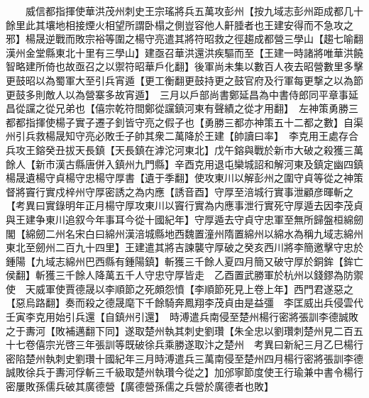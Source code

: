 　　威信都指揮使華洪茂州刺史王宗瑤將兵五萬攻彭州【按九域志彭州距成都几十餘里此其壤地相接煙火相望所謂卧榻之側豈容他人鼾腄者也王建安得而不急攻之邪】楊晟逆戰而敗宗裕等圍之楊守亮遣其將符昭救之徑趨成都營三學山【趨七喻翻漢州金堂縣東北十里有三學山】建亟召華洪還洪疾驅而至【王建一時諸將唯華洪饒智略建所倚也故亟召之以禦符昭華戶化翻】後軍尚未集以數百人夜去昭營數里多擊更鼓昭以為蜀軍大至引兵宵遁【更工衡翻更鼓持更之鼓官府及行軍每更撃之以為節更鼓多則敵人以為營寨多故宵遁】　三月以戶部尚書鄭延昌為中書侍郎同平章事延昌從讜之從兄弟也【僖宗乾符間鄭從讜鎮河東有聲績之從才用翻】　左神策勇勝三都都指揮使楊子實子遷子釗皆守亮之假子也【勇勝三都亦神策五十二都之數】自渠州引兵救楊晟知守亮必敗壬子帥其衆二萬降於王建【帥讀曰率】　李克用王處存合兵攻王鎔癸丑拔天長鎮【天長鎮在滹沱河東北】戊午鎔與戰於新市大破之殺獲三萬餘人【新市漢古縣唐併入鎮州九門縣】辛酉克用退屯欒城詔和解河東及鎮定幽四鎮　楊晟遺楊守貞楊守忠楊守厚書【遺于季翻】使攻東川以解彭州之圍守貞等從之神策督將竇行實戍梓州守厚密誘之為内應【誘音酉】守厚至涪城行實事泄顧彦暉斬之　【考異曰實錄明年正月楊守厚攻東川以竇行實為内應事泄行實死守厚遁去因李茂貞與王建争東川追叙今年事耳今從十國紀年】守厚遁去守貞守忠軍至無所歸盤桓綿劒閣【綿劒二州名宋白曰綿州漢涪城縣地西魏置潼州隋置綿州以綿水為稱九域志綿州東北至劒州二百九十四里】王建遣其將吉諫襲守厚破之癸亥西川將李簡邀擊守忠於鍾陽【九域志綿州巴西縣有鍾陽鎮】斬獲三千餘人夏四月簡又破守厚於銅鉾【鉾亡侯翻】斬獲三千餘人降萬五千人守忠守厚皆走　乙酉置武勝軍於杭州以錢鏐為防禦使　天威軍使賈德晟以李順節之死頗怨憤【李順節死見上卷上年】西門君遂惡之【惡烏路翻】奏而殺之德晟麾下千餘騎奔鳳翔李茂貞由是益彊　李匡威出兵侵雲代壬寅李克用始引兵還【自鎮州引還】　時溥遣兵南侵至楚州楊行密將張訓李德誠敗之于夀河【敗補邁翻下同】遂取楚州執其刺史劉瓚【朱全忠以劉瓚刺楚州見二百五十七卷僖宗光啓三年張訓等既破徐兵乘勝遂取汴之楚州　考異曰新紀三月乙巳楊行密陷楚州執刺史劉瓚十國紀年三月時溥遣兵三萬南侵至楚州四月楊行密將張訓李德誠敗徐兵于夀河俘斬三千級取楚州執瓚今從之】加邠寧節度使王行瑜兼中書令楊行密屢敗孫儒兵破其廣德營【廣德營孫儒之兵營於廣德者也敗】

